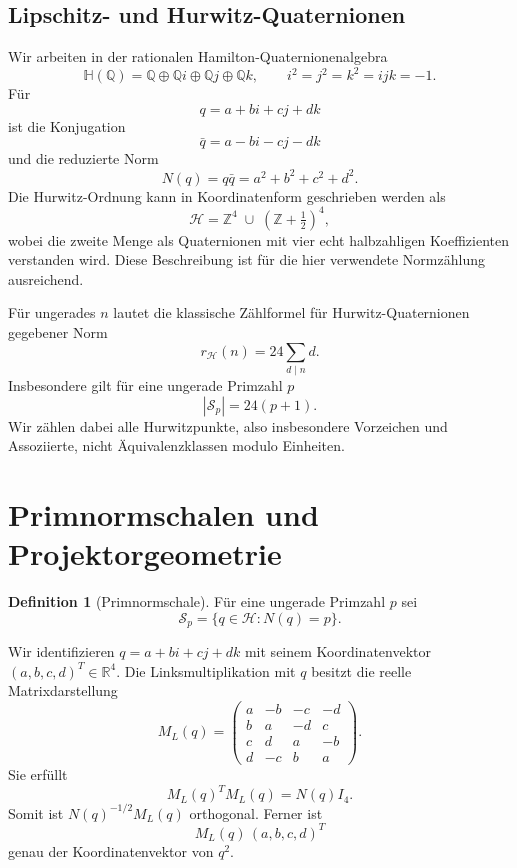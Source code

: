 \documentclass[11pt,a4paper]{article}
\theoremstyle{definition}
\newtheorem{definition}[satz]{Definition}
\newcommand{\HH}{\mathcal H}
\newcommand{\ZZ}{\mathbb Z}
\newcommand{\QQ}{\mathbb Q}
\newcommand{\RR}{\mathbb R}
\begin{document}
\subsection{Lipschitz- und Hurwitz-Quaternionen}
Wir arbeiten in der rationalen Hamilton-Quaternionenalgebra
\[
\mathbb H(\QQ)=\QQ\oplus\QQ i\oplus\QQ j\oplus\QQ k,
\qquad i^2=j^2=k^2=ijk=-1.
\]
Für
\[
q=a+bi+cj+dk
\]
ist die Konjugation
\[
\bar q=a-bi-cj-dk
\]
und die reduzierte Norm
\[
N(q)=q\bar q=a^2+b^2+c^2+d^2.
\]
Die Hurwitz-Ordnung kann in Koordinatenform geschrieben werden als
\begin{equation}\label{eq:hurwitzorder}
\HH=\ZZ^4\;\cup\;\left(\ZZ+\tfrac12\right)^4,
\end{equation}
wobei die zweite Menge als Quaternionen mit vier echt halbzahligen Koeffizienten verstanden wird. Diese Beschreibung ist für die hier verwendete Normzählung ausreichend.

Für ungerades $n$ lautet die klassische Zählformel für Hurwitz-Quaternionen gegebener Norm
\begin{equation}\label{eq:hurwitzcount}
r_{\HH}(n)=24\sum_{d\mid n}d.
\end{equation}
Insbesondere gilt für eine ungerade Primzahl $p$
\begin{equation}\label{eq:shellsize}
|\mathcal S_p|=24(p+1).
\end{equation}
Wir zählen dabei alle Hurwitzpunkte, also insbesondere Vorzeichen und Assoziierte, nicht Äquivalenzklassen modulo Einheiten.

\section{Primnormschalen und Projektorgeometrie}\label{sec:hurwitz}
\begin{definition}[Primnormschale]
Für eine ungerade Primzahl $p$ sei
\[
\mathcal S_p=\{q\in\HH:N(q)=p\}.
\]
\end{definition}

Wir identifizieren $q=a+bi+cj+dk$ mit seinem Koordinatenvektor $(a,b,c,d)^T\in\RR^4$. Die Linksmultiplikation mit $q$ besitzt die reelle Matrixdarstellung
\begin{equation}\label{eq:leftmatrix}
M_L(q)=
\begin{pmatrix}
a&-b&-c&-d\\
b&a&-d&c\\
c&d&a&-b\\
d&-c&b&a
\end{pmatrix}.
\end{equation}
Sie erfüllt
\begin{equation}\label{eq:similitude}
M_L(q)^T M_L(q)=N(q)I_4.
\end{equation}
Somit ist $N(q)^{-1/2}M_L(q)$ orthogonal. Ferner ist
\[
M_L(q)\,(a,b,c,d)^T
\]
genau der Koordinatenvektor von $q^2$.
\end{document}
